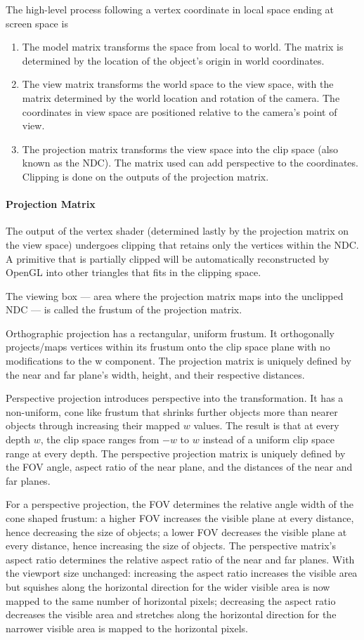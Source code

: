 \documentclass[11pt]{article}
\numberwithin{equation}{section}
\begin{document}
The high-level process following a vertex coordinate in local space ending at screen space is
\begin{enumerate}
	\item The model matrix transforms the space from local to world. The matrix is determined by the location of the object's origin in world coordinates.
	\item The view matrix transforms the world space to the view space, with the matrix determined by the world location and rotation of the camera. The coordinates in view space are positioned relative to the camera's point of view.
	\item The projection matrix transforms the view space into the clip space (also known as the NDC). The matrix used can add perspective to the coordinates. Clipping is done on the outputs of the projection matrix.
\end{enumerate}

\paragraph{Projection Matrix}
The output of the vertex shader (determined lastly by the projection matrix on the view space) undergoes clipping that retains only the vertices within the NDC. A primitive that is partially clipped will be automatically reconstructed by OpenGL into other triangles that fits in the clipping space.

The viewing box --- area where the projection matrix maps into the unclipped NDC --- is called the frustum of the projection matrix.

Orthographic projection has a rectangular, uniform frustum. It orthogonally projects/maps vertices within its frustum onto the clip space plane with no modifications to the w component. The projection matrix is uniquely defined by the near and far plane's width, height, and their respective distances.

Perspective projection introduces perspective into the transformation. It has a non-uniform, cone like frustum that shrinks further objects more than nearer objects through increasing their mapped $w$ values. The result is that at every depth $w$, the clip space ranges from $-w$ to $w$ instead of a uniform clip space range at every depth. The perspective projection matrix is uniquely defined by the FOV angle, aspect ratio of the near plane, and the distances of the near and far planes.

For a perspective projection, the FOV determines the relative angle width of the cone shaped frustum: a higher FOV increases the visible plane at every distance, hence decreasing the size of objects; a lower FOV decreases the visible plane at every distance, hence increasing the size of objects. The perspective matrix's aspect ratio determines the relative aspect ratio of the near and far planes. With the viewport size unchanged: increasing the aspect ratio increases the visible area but squishes along the horizontal direction for the wider visible area is now mapped to the same number of horizontal pixels; decreasing the aspect ratio decreases the visible area and stretches along the horizontal direction for the narrower visible area is mapped to the horizontal pixels.
\end{document}
